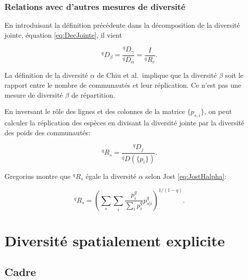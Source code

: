 \documentclass[
  11pt,
  french,
  a4paper,
  extrafontsizes,onecolumn,openright
  ]{memoir}
\begin{document}
\hypertarget{relations-avec-dautres-mesures-de-diversituxe9}{%
\section{Relations avec d'autres mesures de diversité}\label{relations-avec-dautres-mesures-de-diversituxe9}}

En introduisant la définition précédente dans la décomposition de la diversité jointe, équation \eqref{eq:DecJointe}, il vient

\begin{equation}
  \label{eq:DqbetaChiu}
  ^{q}\!D_{\beta}
  = \frac{^{q}\!D_{\gamma}}{^{q}\!D_{\alpha}}
  = \frac{I}{^{q}\!R_{c}}.
\end{equation}

La définition de la diversité \(\alpha\) de Chiu et al.~implique que la diversité \(\beta\) soit le rapport entre le nombre de communautés et leur réplication.
Ce n'est pas une mesure de diversité \(\beta\) de répartition.

En inversant le rôle des lignes et des colonnes de la matrice \(\{p_{s,i}\}\), on peut calculer la réplication des espèces en divisant la diversité jointe par la diversité des poids des communautés:

\begin{equation}
  \label{eq:Replication}
  ^{q}\!R_{s}
  = \frac{^{q}\!D_{j}}{^{q}\!D\left(\{p_{i}\}\right)}.
\end{equation}

Gregorius montre que \(^{q}\!R_{s}\) égale la diversité \(\alpha\) selon Jost \eqref{eq:JostHalpha}:

\begin{equation}
  \label{eq:JostGregorius}
  ^{q}\!R_{s}
  = {\left(\sum_s{\sum_i{\frac{p^q_i}{\sum_i{p^q_i}}p^q_{s|i}}}\right)}^{{1}/{\left(1-q\right)}}.
\end{equation}

\hypertarget{part-diversituxe9-spatialement-explicite}{%
\part{Diversité spatialement explicite}\label{part-diversituxe9-spatialement-explicite}}

\hypertarget{sec-spatialCadre}{%
\chapter{Cadre}\label{sec-spatialCadre}}
\end{document}
